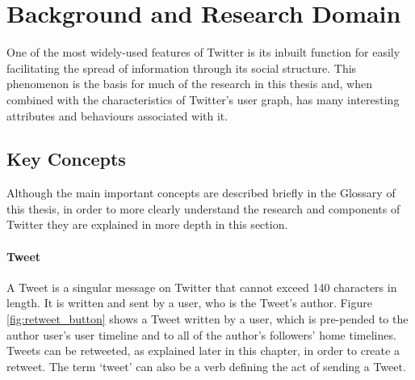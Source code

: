 \chapter{Background and Research Domain}
One of the most widely-used features of Twitter is its inbuilt function for easily facilitating the spread of information through its social structure. This phenomenon is the basis for much of the research in this thesis and, when combined with the characteristics of Twitter's user graph, has many interesting attributes and behaviours associated with it.

\section{Key Concepts}
Although the main important concepts are described briefly in the Glossary of this thesis, in order to more clearly understand the research and components of Twitter they are explained in more depth in this section.

\subsubsection{Tweet}
A Tweet is a singular message on Twitter that cannot exceed 140 characters in length. It is written and sent by a user, who is the Tweet's author. Figure \ref{fig:retweet_button} shows a Tweet written by a user, which is pre-pended to the author user's user timeline and to all of the author's followers' home timelines. Tweets can be retweeted, as explained later in this chapter, in order to create a retweet. The term `tweet' can also be a verb defining the act of sending a Tweet.


